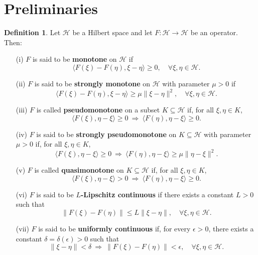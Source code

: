 \documentclass[hidelinks,11 pt]{article}
\numberwithin{equation}{section}
\theoremstyle{definition}  %
\newtheorem{definition}[theorem]{Definition}
\numberwithin{equation}{section}
\numberwithin{theorem}{section}
\begin{document}
\section{Preliminaries}\label{sec:prelim}
\begin{definition}\label{def:monotonicity}
Let \( \mathcal{H} \) be a Hilbert space and let \( F : \mathcal{H} \to \mathcal{H} \) be an operator. Then:

\begin{itemize}
    \item[(i)] \( F \) is said to be \textbf{monotone} on \( \mathcal{H} \) if
    \[
    \langle F(\xi) - F(\eta), \xi - \eta \rangle \geq 0, \quad \forall \xi, \eta \in \mathcal{H}.
    \]

    \item[(ii)] \( F \) is said to be \textbf{strongly monotone} on \( \mathcal{H} \) with parameter \( \mu > 0 \) if
    \[
    \langle F(\xi) - F(\eta), \xi - \eta \rangle \geq \mu \|\xi - \eta\|^2, \quad \forall \xi, \eta \in \mathcal{H}.
    \]

    \item[(iii)] \( F \) is called \textbf{pseudomonotone} on a subset \( K \subseteq \mathcal{H} \) if, for all \( \xi, \eta \in K \),
    \[
    \langle F(\xi), \eta - \xi \rangle \geq 0 \ \Rightarrow\ \langle F(\eta), \eta - \xi \rangle \geq 0.
    \]

    \item[(iv)] \( F \) is said to be \textbf{strongly pseudomonotone} on \( K \subseteq \mathcal{H} \) with parameter \( \mu > 0 \) if, for all \( \xi, \eta \in K \),
    \[
    \langle F(\xi), \eta - \xi \rangle \geq 0 \ \Rightarrow\ \langle F(\eta), \eta - \xi \rangle \geq \mu \|\eta - \xi\|^2.
    \]

    \item[(v)] \( F \) is called \textbf{quasimonotone} on \( K \subseteq \mathcal{H} \) if, for all \( \xi, \eta \in K \),
    \[
    \langle F(\xi), \eta - \xi \rangle > 0 \ \Rightarrow\ \langle F(\eta), \eta - \xi \rangle \geq 0.
    \]

    \item[(vi)] \( F \) is said to be \textbf{\( L \)-Lipschitz continuous} if there exists a constant \( L > 0 \) such that
    \[
    \|F(\xi) - F(\eta)\| \leq L \|\xi - \eta\|, \quad \forall \xi, \eta \in \mathcal{H}.
    \]

    \item[(vii)] \( F \) is said to be \textbf{uniformly continuous} if, for every \( \epsilon > 0 \), there exists a constant \( \delta = \delta(\epsilon) > 0 \) such that
    \[
    \|\xi - \eta\| < \delta \ \Rightarrow\ \|F(\xi) - F(\eta)\| < \epsilon, \quad \forall \xi, \eta \in \mathcal{H}.
    \]
\end{itemize}
\end{definition}
\end{document}

